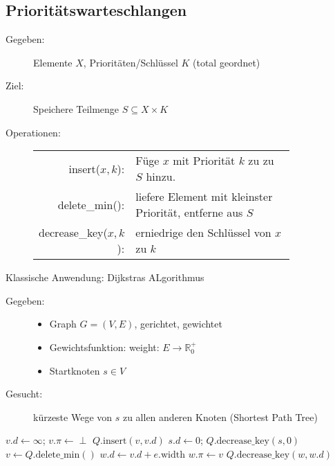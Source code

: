 \subsection{Prioritätswarteschlangen}
\begin{description}
 \item[Gegeben:] Elemente $X$, Prioritäten/Schlüssel $K$ (total geordnet)
 \item[Ziel:] Speichere Teilmenge $S \subseteq X \times K$
 \item[Operationen:] \hfill
    \begin{center}
        \begin{tabular}{rp{0.8\linewidth}}
            insert($x,k$): & Füge $x$ mit Priorität $k$ zu zu $S$ hinzu. \\
            delete\_min(): & liefere Element mit kleinster Priorität, entferne aus $S$ \\
            decrease\_key($x,k$): & erniedrige den Schlüssel von $x$ zu $k$
        \end{tabular}
    \end{center}
\end{description}
Klassische Anwendung: Dijkstras ALgorithmus
\begin{description}
 \item[Gegeben:]
     \begin{itemize}
      \item Graph $G = (V,E)$, gerichtet, gewichtet
      \item Gewichtsfunktion: weight: $E \to \mathbb{R}^+_0$
      \item Startknoten $s \in V$
     \end{itemize}
 \item[Gesucht:] kürzeste Wege von $s$ zu allen anderen Knoten (Shortest Path Tree)
\end{description}
\begin{algorithmic}
    \STATE $v.d \gets \infty$; $v.\pi \gets \perp$
    \STATE $Q.\text{insert}(v,v.d)$
\ENDFOR
\STATE $s.d \gets 0$; $Q.\text{decrease\_key}(s,0)$
    \STATE $v \gets Q.\text{delete\_min}()$
            \STATE $w.d \gets v.d + e.\text{width}$
            \STATE $w.\pi \gets v$
            \STATE $Q.\text{decrease\_key}(w,w.d)$
        \ENDIF
    \ENDFOR
\ENDWHILE
\end{algorithmic}
